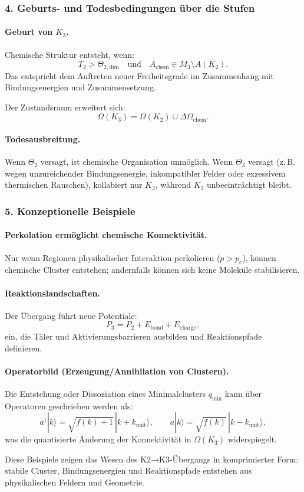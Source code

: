 \subsubsection{4. Geburts- und Todesbedingungen über die Stufen}

\paragraph{Geburt von \texorpdfstring{$K_3$}{K_3}.}
Chemische Struktur entsteht, wenn:
\[
T_2 > \Theta_{2,\mathrm{dim}}
\quad \text{und} \quad
A_{\mathrm{chem}} \in M_3 \setminus A(K_2).
\]
Das entspricht dem Auftreten neuer Freiheitsgrade im Zusammenhang mit
Bindungsenergien und Zusammensetzung.

Der Zustandsraum erweitert sich:
\[
\Omega(K_3) = \Omega(K_2) \cup \Delta\Omega_{\mathrm{chem}}.
\]

\paragraph{Todesausbreitung.}
Wenn $\Theta_2$ versagt, ist chemische Organisation unmöglich.
Wenn $\Theta_3$ versagt (z.\,B. wegen unzureichender Bindungsenergie,
inkompatibler Felder oder exzessivem thermischen Rauschen), kollabiert nur
$K_3$, während $K_2$ unbeeinträchtigt bleibt.

\subsubsection{5. Konzeptionelle Beispiele}

\paragraph{Perkolation ermöglicht chemische Konnektivität.}
Nur wenn Regionen physikalischer Interaktion perkolieren ($p>p_c$), können chemische
Cluster entstehen; andernfalls können sich keine Moleküle stabilisieren.

\paragraph{Reaktionslandschaften.}
Der Übergang führt neue Potentiale:
\[
P_3 = P_2 + E_{\mathrm{bond}} + E_{\mathrm{charge}},
\]
ein, die Täler und Aktivierungsbarrieren ausbilden und Reaktionspfade definieren.

\paragraph{Operatorbild (Erzeugung/Annihilation von Clustern).}
Die Entstehung oder Dissoziation eines Minimalclusters $q_{\mathrm{min}}$ kann über
Operatoren geschrieben werden als:
\[
a^{\dagger} |k\rangle = \sqrt{f(k)+1}\,|k+k_{\mathrm{unit}}\rangle,
\qquad
a |k\rangle = \sqrt{f(k)}\,|k-k_{\mathrm{unit}}\rangle,
\]
was die quantisierte Änderung der Konnektivität in $\Omega(K_3)$ widerspiegelt.

Diese Beispiele zeigen das Wesen des K2→K3-Übergangs in komprimierter Form:
stabile Cluster, Bindungsenergien und Reaktionspfade entstehen aus physikalischen
Feldern und Geometrie.
